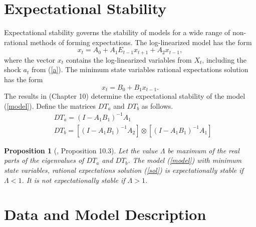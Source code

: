 \documentclass[]{article}
\newtheorem{proposition}[theorem]{Proposition}
\begin{document}
\printbibliography

\clearpage
\appendix
\section{Expectational Stability}

 Expectational stability governs the stability of models for a wide range of non-rational methods of forming expectations. The log-linearized model has the form
\begin{equation}
    x_{t} = A_{0} + A_{1}E_{t-1}x_{t+1} + A_{2}x_{t-1},
    \label{model}
\end{equation}
where the vector $x_{t}$ contains the log-linearized variables from $X_{t}$, including the shock $a_{t}$ from (\ref{a}).
The minimum state variables rational expectations solution has the form
\begin{equation}
    x_{t}=B_{0}+B_{1}x_{t-1}.
    \label{sol}
\end{equation}
The results in \textcite{evans2001learning} (Chapter 10) determine the expectational stability of the model (\ref{model}). Define the matrices $DT_{a}$ and $DT_{b}$ as follows.
\begin{eqnarray}
     & DT_{a}=(I-A_{1}B_{1})^{-1}A_{1} \\
     & DT_{b}=[(I-A_{1}B_{1})^{-1}A_{2}]\otimes[(I-A_{1}B_{1})^{-1}A_{1}]
\end{eqnarray}

\begin{proposition}
  [\textcite{evans2001learning}, Proposition 10.3] Let the value $\Lambda$ be maximum of the real parts of the eigenvalues of $DT_{a}$ and $DT_{b}$. The model (\ref{model}) with minimum state variables, rational expectations solution (\ref{sol}) is expectationally stable if $\Lambda<1$. It is not expectationally stable  if $\Lambda>1$.  
\end{proposition}



\clearpage

\section{Data and Model Description}
\label{app:data}
\end{document}
